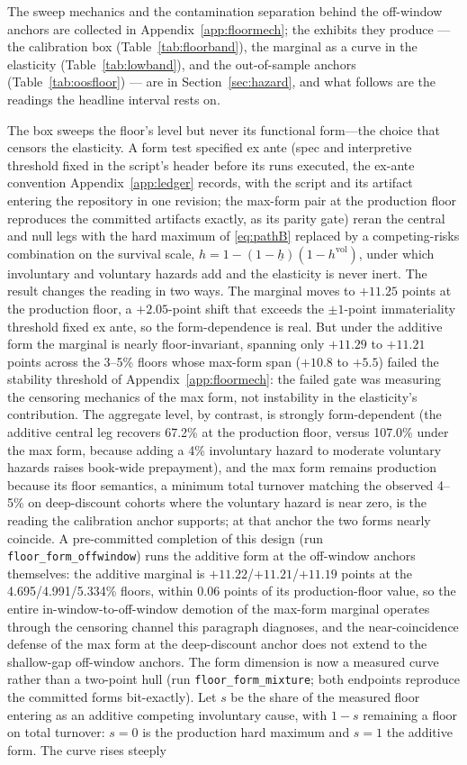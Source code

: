 \documentclass[12pt]{article}
\begin{document}
The sweep mechanics and the contamination separation behind the off-window anchors are collected in Appendix~\ref{app:floormech}; the exhibits they produce --- the calibration box (Table~\ref{tab:floorband}), the marginal as a curve in the elasticity (Table~\ref{tab:lowband}), and the out-of-sample anchors (Table~\ref{tab:oosfloor}) --- are in Section~\ref{sec:hazard}, and what follows are the readings the headline interval rests on.

The box sweeps the floor's level but never its functional form---the choice that censors the elasticity. A form test specified ex ante (spec and interpretive threshold fixed in the script's header before its runs executed, the ex-ante convention Appendix~\ref{app:ledger} records, with the script and its artifact entering the repository in one revision; the max-form pair at the production floor reproduces the committed artifacts exactly, as its parity gate) reran the central and null legs with the hard maximum of \eqref{eq:pathB} replaced by a competing-risks combination on the survival scale, $h = 1 - (1 - \underline{h})(1 - h^{\mathrm{vol}})$, under which involuntary and voluntary hazards add and the elasticity is never inert. The result changes the reading in two ways. The marginal moves to $+11.25$ points at the production floor, a $+2.05$-point shift that exceeds the $\pm 1$-point immateriality threshold fixed ex ante, so the form-dependence is real. But under the additive form the marginal is nearly floor-invariant, spanning only $+11.29$ to $+11.21$ points across the 3--5\% floors whose max-form span ($+10.8$ to $+5.5$) failed the stability threshold of Appendix~\ref{app:floormech}: the failed gate was measuring the censoring mechanics of the max form, not instability in the elasticity's contribution. The aggregate level, by contrast, is strongly form-dependent (the additive central leg recovers 67.2\% at the production floor, versus 107.0\% under the max form, because adding a 4\% involuntary hazard to moderate voluntary hazards raises book-wide prepayment), and the max form remains production because its floor semantics, a minimum total turnover matching the observed 4--5\% on deep-discount cohorts where the voluntary hazard is near zero, is the reading the calibration anchor supports; at that anchor the two forms nearly coincide. A pre-committed completion of this design (run \texttt{floor\_form\_offwindow}) runs the additive form at the off-window anchors themselves: the additive marginal is $+11.22$/$+11.21$/$+11.19$ points at the 4.695/4.991/5.334\% floors, within 0.06 points of its production-floor value, so the entire in-window-to-off-window demotion of the max-form marginal operates through the censoring channel this paragraph diagnoses, and the near-coincidence defense of the max form at the deep-discount anchor does not extend to the shallow-gap off-window anchors. The form dimension is now a measured curve rather than a two-point hull (run \texttt{floor\_form\_mixture}; both endpoints reproduce the committed forms bit-exactly). Let $s$ be the share of the measured floor entering as an additive competing involuntary cause, with $1-s$ remaining a floor on total turnover: $s = 0$ is the production hard maximum and $s = 1$ the additive form. The curve rises steeply 
\end{document}
